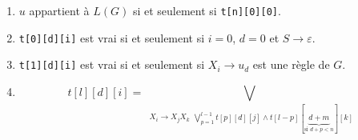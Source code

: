 \documentclass[preview, varwidth=500px, convert={outfile=\jobname.png}, border=2pt]{standalone}
\begin{document}
\begin{enumerate}
    \item $u$ appartient à $L(G)$ si et seulement si \texttt{t[n][0][0]}.
    \item \texttt{t[0][d][i]} est vrai si et seulement si $i = 0$, $d = 0$ et $S \rightarrow \varepsilon$.
    \item \texttt{t[1][d][i]} est vrai si et seulement si $X_i \rightarrow u_d$ est une règle de $G$.
    \item $$t[l][d][i] = \bigvee_{\substack{X_i \rightarrow X_j X_k} \bigvee_{p = 1}^{l-1} t[p][d][j] \land t[l-p][\underbrace{d+m}_{\text{si }d + p < n}][k]}$$
\end{enumerate}
\end{document}
